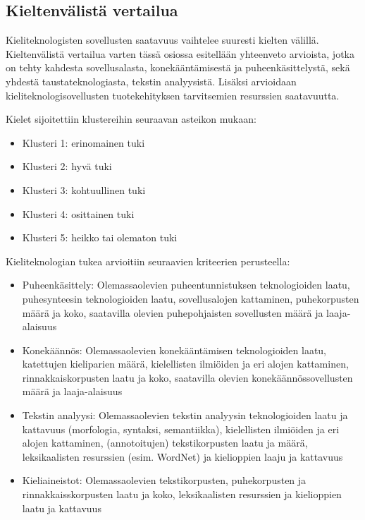 \documentclass[]{../../metanetpaper}
\begin{document}
\begin{multicols}{2}
\subsection{Kieltenvälistä vertailua}


Kieliteknologisten sovellusten saatavuus
vaihtelee suuresti kielten välillä.
Kieltenvälistä vertailua varten tässä osiossa
esitellään yhteenveto arvioista, jotka on tehty
kahdesta sovellusalasta,
konekääntämisestä ja puheenkäsittelystä, sekä
yhdestä taustateknologiasta, tekstin
analyysistä. Lisäksi arvioidaan
kieliteknologisovellusten tuotekehityksen
tarvitsemien resurssien saatavuutta.

Kielet sijoitettiin klustereihin seuraavan
asteikon mukaan:
\begin{itemize}
\item[] Klusteri 1: erinomainen tuki
\item[] Klusteri 2: hyvä tuki
\item[] Klusteri 3: kohtuullinen tuki
\item[] Klusteri 4: osittainen tuki
\item[] Klusteri 5: heikko tai olematon tuki
\end{itemize}

Kieliteknologian tukea arvioitiin seuraavien kriteerien
perusteella:
\begin{itemize}
\item Puheenkäsittely: Olemassaolevien puheentunnistuksen teknologioiden
laatu, puhesynteesin teknologioiden laatu, sovellusalojen kattaminen,
puhekorpusten määrä ja koko, saatavilla olevien puhepohjaisten
sovellusten määrä ja laaja-alaisuus

\item Konekäännös: Olemassaolevien konekääntämisen teknologioiden
laatu, katettujen kieliparien määrä, kielellisten ilmiöiden ja
eri alojen kattaminen, rinnakkaiskorpusten laatu ja koko,
saatavilla olevien konekäännössovellusten määrä ja laaja-alaisuus

\item Tekstin analyysi: Olemassaolevien tekstin
analyysin teknologioiden laatu ja kattavuus (morfologia, syntaksi,
semantiikka), kielellisten ilmiöiden ja eri alojen kattaminen,
(annotoitujen) tekstikorpusten laatu ja määrä, leksikaalisten resurssien
(esim. WordNet) ja kielioppien laaju ja kattavuus

\item Kieliaineistot: Olemassaolevien tekstikorpusten, puhekorpusten ja
rinnakkaisskorpusten laatu ja koko, leksikaalisten resurssien ja
kielioppien laatu ja kattavuus
\end{itemize}




\end{multicols}
\end{document}
